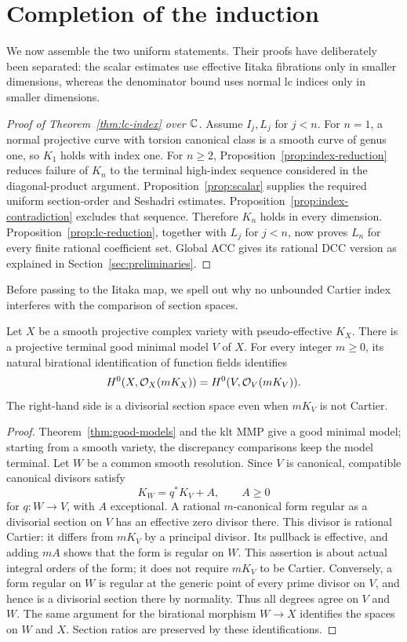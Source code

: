 \section{Completion of the induction}\label{sec:completion}

We now assemble the two uniform statements. Their proofs have deliberately
been separated: the scalar estimates use effective Iitaka fibrations
only in smaller dimensions, whereas the denominator bound uses normal
lc indices only in smaller dimensions.

\begin{proof}[Proof of Theorem~\ref{thm:lc-index} over $\mathbb C$]
Assume $I_j,L_j$ for $j<n$. For $n=1$, a normal projective curve
with torsion canonical class is a smooth curve of genus one, so
$K_1$ holds with index one. For $n\geq2$, Proposition~\ref{prop:index-reduction}
reduces failure of $K_n$ to the terminal high-index sequence considered
in the diagonal-product argument. Proposition~\ref{prop:scalar}
supplies the required uniform section-order and Seshadri estimates.
Proposition~\ref{prop:index-contradiction} excludes that sequence.
Therefore $K_n$ holds in every dimension. Proposition~\ref{prop:lc-reduction}, together
with $L_j$ for $j<n$, now proves $L_n$ for every finite rational
coefficient set. Global ACC gives its rational DCC version as explained
in Section~\ref{sec:preliminaries}.
\end{proof}

Before passing to the Iitaka map, we spell out why no unbounded
Cartier index interferes with the comparison of section spaces.

\begin{lemma}\label{lem:all-degree}
Let $X$ be a smooth projective complex variety with pseudo-effective
$K_X$. There is a projective terminal good minimal model $V$ of $X$.
For every integer $m\geq0$, its natural birational identification of
function fields identifies
\[
          H^0(X,\mathcal O_X(mK_X))=H^0(V,\mathcal O_V(mK_V)).
\]
The right-hand side is a divisorial section space even when $mK_V$
is not Cartier.
\end{lemma}
\begin{proof}
Theorem~\ref{thm:good-models} and the klt MMP give a good minimal
model; starting from a smooth variety, the discrepancy comparisons
keep the model terminal. Let $W$ be a common smooth resolution. Since
$V$ is canonical, compatible canonical divisors satisfy
\[
                   K_W=q^*K_V+A,\qquad A\geq0
\]
for $q:W\to V$, with $A$ exceptional. A rational $m$-canonical form
regular as a divisorial section on $V$ has an effective zero divisor
there. This divisor is rational Cartier: it differs from $mK_V$ by
a principal divisor. Its pullback is effective, and adding $mA$
shows that the form is regular on $W$. This assertion is about actual
integral orders of the form; it does not require $mK_V$ to be Cartier.
Conversely, a form regular on $W$ is regular at the generic point of
every prime divisor on $V$, and hence is a divisorial section there
by normality. Thus all degrees agree on $V$ and $W$. The same argument
for the birational morphism $W\to X$ identifies the spaces on $W$
and $X$. Section ratios are preserved by these identifications.
\end{proof}

